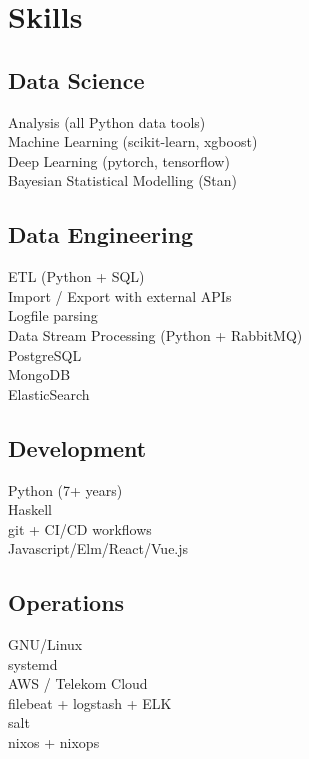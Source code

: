 \documentclass[]{deedy-resume-openfont}
\begin{document}
\begin{minipage}[t]{0.33\textwidth}



\sectionsep
\section{Skills}

\sectionsep
\subsection{Data Science}
\textbullet{} Analysis (all Python data tools) \\
\textbullet{} Machine Learning (scikit-learn, xgboost) \\
\textbullet{} Deep Learning (pytorch, tensorflow) \\
\textbullet{} Bayesian Statistical Modelling (Stan)\\

\sectionsep
\subsection{Data Engineering}
    \textbullet{} ETL (Python + SQL) \\
    \textbullet{} Import / Export with external APIs \\
    \textbullet{} Logfile parsing \\
    \textbullet{} Data Stream Processing (Python + RabbitMQ) \\
    \textbullet{} PostgreSQL \\
    \textbullet{} MongoDB \\
    \textbullet{} ElasticSearch \\

\sectionsep
\subsection{Development}
    \textbullet{} Python (7+ years)  \\
    \textbullet{} Haskell \\
    \textbullet{} git + CI/CD workflows \\
    \textbullet{} Javascript/Elm/React/Vue.js \\

\sectionsep
\subsection{Operations}
    \textbullet{} GNU/Linux \\
    \textbullet{} systemd \\
    \textbullet{} AWS / Telekom Cloud \\
    \textbullet{} filebeat + logstash + ELK \\
    \textbullet{} salt \\
    \textbullet{} nixos + nixops \\
   

\end{minipage}
\end{document}
